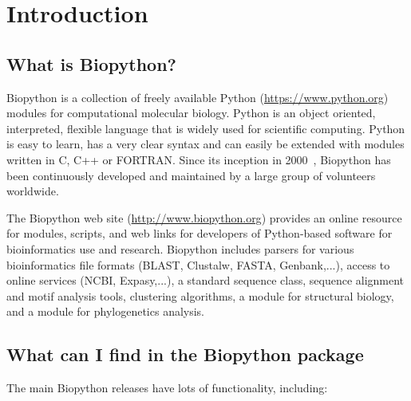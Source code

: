 \chapter{Introduction}
\label{chapter:introduction}

\section{What is Biopython?}

Biopython is a collection of freely available Python (\url{https://www.python.org}) modules for computational molecular biology.
Python is an object oriented, interpreted, flexible language that is widely used for scientific computing. Python is easy to learn, has a very clear syntax and can easily be extended with modules written in C, C++ or FORTRAN.
Since its inception in 2000~\cite{chapman2000}, Biopython has been continuously developed and maintained by a large group of volunteers worldwide.

The Biopython web site (\url{http://www.biopython.org}) provides
an online resource for modules, scripts, and web links for developers
of Python-based software for bioinformatics use and research.
Biopython includes parsers for various bioinformatics file formats
(BLAST, Clustalw, FASTA, Genbank,...), access to online services
(NCBI, Expasy,...), a standard sequence class, sequence alignment and
motif analysis tools, clustering algorithms, a module for structural biology,
and a module for phylogenetics analysis.

\section{What can I find in the Biopython package}

The main Biopython releases have lots of functionality, including:

